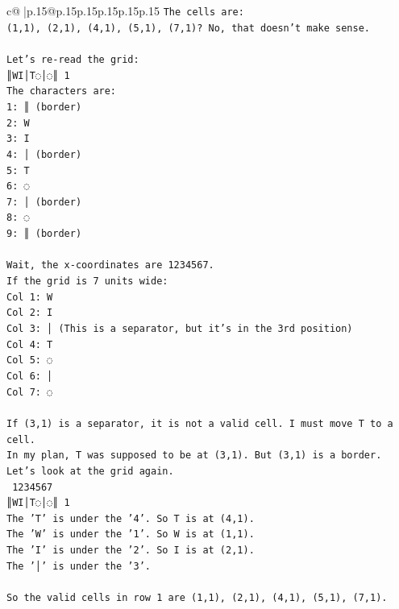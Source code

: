 \documentclass{article}
\begin{document}
{\begin{supertabular}{c@{$\;$}|p{.15\linewidth}@{}p{.15\linewidth}p{.15\linewidth}p{.15\linewidth}p{.15\linewidth}p{.15\linewidth}}
{{{\texttt{The cells are:} \\
\texttt{(1,1), (2,1), (4,1), (5,1), (7,1)? No, that doesn't make sense.} \\
\\ 
\texttt{Let's re{-}read the grid:} \\
\texttt{║WI│T◌│◌║ 1} \\
\texttt{The characters are:} \\
\texttt{1: ║ (border)} \\
\texttt{2: W} \\
\texttt{3: I} \\
\texttt{4: │ (border)} \\
\texttt{5: T} \\
\texttt{6: ◌} \\
\texttt{7: │ (border)} \\
\texttt{8: ◌} \\
\texttt{9: ║ (border)} \\
\\ 
\texttt{Wait, the x{-}coordinates are 1234567.} \\
\texttt{If the grid is 7 units wide:} \\
\texttt{Col 1: W} \\
\texttt{Col 2: I} \\
\texttt{Col 3: │ (This is a separator, but it's in the 3rd position)} \\
\texttt{Col 4: T} \\
\texttt{Col 5: ◌} \\
\texttt{Col 6: │} \\
\texttt{Col 7: ◌} \\
\\ 
\texttt{If (3,1) is a separator, it is not a valid cell. I must move T to a cell.} \\
\texttt{In my plan, T was supposed to be at (3,1). But (3,1) is a border.} \\
\texttt{Let's look at the grid again.} \\
\texttt{ 1234567} \\
\texttt{║WI│T◌│◌║ 1} \\
\texttt{The 'T' is under the '4'. So T is at (4,1).} \\
\texttt{The 'W' is under the '1'. So W is at (1,1).} \\
\texttt{The 'I' is under the '2'. So I is at (2,1).} \\
\texttt{The '│' is under the '3'.} \\
\\ 
\texttt{So the valid cells in row 1 are (1,1), (2,1), (4,1), (5,1), (7,1).} \\
}}}
\end{supertabular}}
\end{document}
